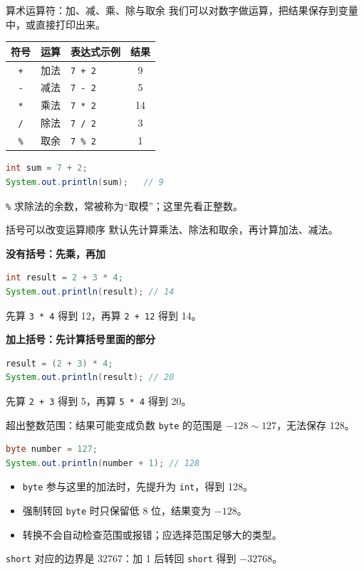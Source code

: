 \documentclass[aspectratio=169]{beamer}
\begin{document}
\begin{frame}[fragile]{算术运算符：加、减、乘、除与取余}
  我们可以对数字做运算，把结果保存到变量中，或直接打印出来。
  \begin{center}
    \renewcommand{\arraystretch}{1.15}
    \begin{tabular}{cllc}
      \textbf{符号} & \textbf{运算} & \textbf{表达式示例} & \textbf{结果} \\
      \hline
      \texttt{+} & 加法 & \texttt{7 + 2} & 9 \\
      \texttt{-} & 减法 & \texttt{7 - 2} & 5 \\
      \texttt{*} & 乘法 & \texttt{7 * 2} & 14 \\
      \texttt{/} & 除法 & \texttt{7 / 2} & 3 \\
      \texttt{\%} & 取余 & \texttt{7 \% 2} & 1 \\
    \end{tabular}
  \end{center}
  \begin{lstlisting}[language=Java]
int sum = 7 + 2;
System.out.println(sum);   // 9
  \end{lstlisting}
  \texttt{\%} 求除法的余数，常被称为“取模”；这里先看正整数。
\end{frame}

\begin{frame}[fragile]{括号可以改变运算顺序}
  默认先计算乘法、除法和取余，再计算加法、减法。
  \par\medskip
  \textbf{没有括号：先乘，再加}
  \begin{lstlisting}[language=Java]
int result = 2 + 3 * 4;
System.out.println(result); // 14
  \end{lstlisting}
  先算 \texttt{3 * 4} 得到 12，再算 \texttt{2 + 12} 得到 14。
  \par\medskip
  \textbf{加上括号：先计算括号里面的部分}
  \begin{lstlisting}[language=Java]
result = (2 + 3) * 4;
System.out.println(result); // 20
  \end{lstlisting}
  先算 \texttt{2 + 3} 得到 5，再算 \texttt{5 * 4} 得到 20。
\end{frame}

\begin{frame}[fragile]{超出整数范围：结果可能变成负数}
  \texttt{byte} 的范围是 $-128 \sim 127$，无法保存 128。
  \begin{lstlisting}[language=Java]
byte number = 127;
System.out.println(number + 1); // 128
  \end{lstlisting}
  \begin{itemize}
    \item \texttt{byte} 参与这里的加法时，先提升为 \texttt{int}，得到 128。
    \item 强制转回 \texttt{byte} 时只保留低 8 位，结果变为 $-128$。
    \item 转换不会自动检查范围或报错；应选择范围足够大的类型。
  \end{itemize}
  \medskip
  \texttt{short} 对应的边界是 32767：加 1 后转回 \texttt{short} 得到 $-32768$。
\end{frame}
\end{document}
